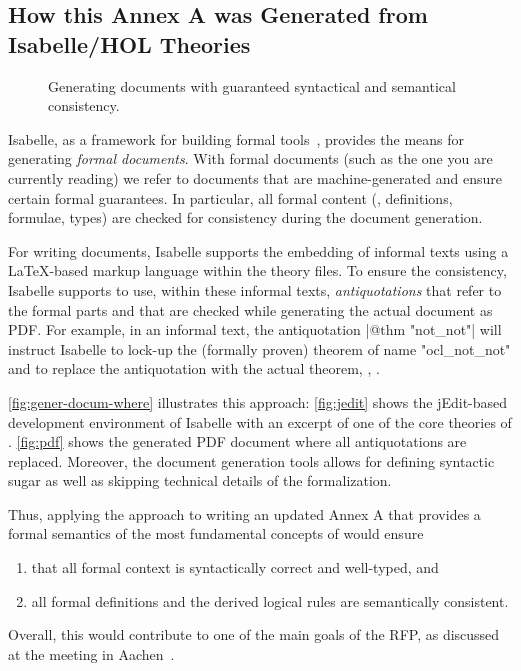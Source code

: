 \subsection{How this Annex A was Generated from Isabelle/HOL Theories}
\begin{figure}[tb]
  \mbox{}\hfill
  \hfill%
  \hfill%
    \hfill\mbox{}
  \caption{Generating documents with guaranteed  syntactical and
    semantical consistency.}
  \label{fig:gener-docum-where}
\end{figure}
Isabelle, as a framework for building formal
tools~\cite{wenzel.ea:building:2007}, provides the means for
generating \emph{formal documents}.  With formal documents (such as
the one you are currently reading) we refer to documents that are
machine-generated and ensure certain formal guarantees. In particular,
all formal content (\eg, definitions, formulae, types) are checked for
consistency during the document generation.

For writing documents, Isabelle supports the embedding of informal
texts using a \LaTeX-based markup language within the theory files. To
ensure the consistency, Isabelle supports to use, within these
informal texts, \emph{antiquotations} that refer to the formal parts
and that are checked while generating the actual document as
PDF\@. For example, in an informal text, the antiquotation
\inlineisar|@{$\text{thm}$ "not_not"}| will instruct Isabelle to
lock-up the (formally proven) theorem of name \inlineisar"ocl_not_not"
and to replace the antiquotation with the actual theorem, \ie,
.

\autoref{fig:gener-docum-where}
illustrates this approach: \autoref{fig:jedit} shows the jEdit-based
development environment of Isabelle with an excerpt of one of the core
theories of \FOCL\@. \autoref{fig:pdf} shows the generated
PDF document where all antiquotations are replaced. Moreover,
the document generation tools allows for defining syntactic sugar as
well as skipping technical details of the formalization.


Thus, applying the  \FOCL approach to writing an updated
Annex A that provides a formal semantics of the most fundamental
concepts of \OCL would ensure
\begin{enumerate}
\item that all formal context is syntactically correct and well-typed,
  and
\item all formal definitions and the derived logical rules are
  semantically consistent.
\end{enumerate}
Overall, this would contribute to one of the main goals of the 
RFP, as discussed at the \OCL meeting in
Aachen~\cite{brucker.ea:summary-aachen:2013}.




